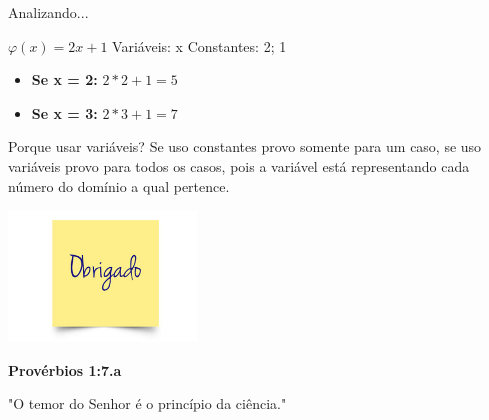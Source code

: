 \documentclass{beamer}
\begin{document}
    \begin{frame}{Analizando...}
        \begin{block}{$\varphi(x) = 2x + 1$}
            Variáveis: x
            \newline
            Constantes: 2; 1
            \begin{itemize}
                \item \textbf{Se x = 2:}
                \newline
                $2 * 2 + 1 = 5$
                \newline
                \item \textbf{Se x = 3:}
                \newline
                $2 * 3 + 1 = 7$
            \end{itemize}
        \end{block}
        \begin{alertblock}{Porque usar variáveis?}
            Se uso constantes provo somente para um caso, se uso variáveis provo para todos os casos, pois a variável está representando cada número do domínio a qual pertence.
        \end{alertblock}
    \end{frame}
    
    \begin{frame}
        \begin{center}
            \includegraphics[width=5cm]{imagens/obrigado.jpg}
        \end{center}
        \begin{center}
            \textbf{Provérbios 1:7.a}
        \end{center}
        \begin{center}
            "O temor do Senhor é o princípio da ciência."
        \end{center}
    \end{frame}
    
\end{document}
